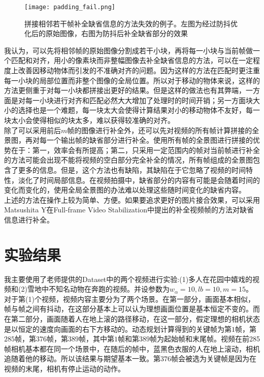 \documentclass[journal, a4paper]{IEEEtran}
\begin{document}
    \begin{figure}[!hbt]
    \begin{center}
    \texttt{[image: padding\_fail.png]}
    \caption{拼接相邻若干帧补全缺省信息的方法失效的例子。左图为经过防抖优化后的原始图像，右图为防抖后补全缺省部分的效果}
    \label{fig:padding_fail}
    \end{center}
  \end{figure}
    
    我认为，可以先将相邻帧的原始图像分割成若干小块，再将每一小块与当前帧做一个匹配和对齐，用小的像素块而非整幅图像去补全缺省信息的方法，可以在一定程度上改善因移动物体而引发的不准确对齐的问题。因为这样的方法在匹配时更注重每一小块的局部位置而非整个图像的全局位置。所以对于移动的物体来说，这样的方法更侧重于对每一小块都拼接出更好的结果。但是这样的做法也有其弊端，一方面是对每一小块进行对齐和匹配必然大大增加了处理时的时间开销；另一方面块大小的选择也是一个难题，每一块太大会使得计算结果对小的移动物体不友好，每一块太小会使得相似的块太多，难以获得较准确的对齐。\\
    
    除了可以采用前后$m$帧的图像进行补全外，还可以先对视频的所有帧计算拼接的全景图，再对每一个输出帧的缺省部分进行补全。使用所有帧的全景图进行拼接的优势在于：第一，效率会有所提高；第二，只采用一定范围内的帧对当前帧进行补全的方法可能会出现不能将视频的空白部分完全补全的情况，所有帧组成的全景图包含了更多的信息。但是，这个方法也有缺陷，其缺陷在于它忽略了视频的时间特性，淡化了时间局部信息。在视频拍摄中，缺省部分的内容有可能是会随着时间的变化而变化的，使用全局全景图的办法难以处理这些随时间变化的缺省内容。 \\
    
    上述的方法在操作上较为简单、方便。如果要追求更好的图片接合效果，可以采用Matsushita Y在Full-frame Video Stabilization\cite{full_frame}中提出的补全视频帧的方法对缺省信息进行补全。
    
    
\section{实验结果}
  我主要使用了老师提供的Dataset中的两个视频进行实验:(1)多人在花园中嬉戏的视频和(2)雪地中不知名动物在奔跑的视频。并设参数为$w_\alpha =10,lb=10,m=15$。 \\
    
    对于第(1)个视频，视频内容主要分为了两个场景。在第一部分，画面基本相似，帧与帧之间有抖动，在这部分基本上可以认为理想画面位置是基本恒定不变的。而在第二部分，画面随着人在地上滚的路径移动，在这一部分，假定理想的相机状态是以恒定的速度向画面的右下方移动的。动态规划计算得到的关键帧为第$1$帧，第$285$帧，第$376$帧，第$389$帧，其中第$1$帧和第$389$帧为起始帧和末尾帧。视频在前285帧相机基本都在同一个场景中，在随后的帧中，蓝黑色衣服的人在地上滚动，相机追随着他的移动。所以该结果与期望基本一致。第$376$帧会被选为关键帧是因为在视频的末尾，相机有停止运动的动作。\\
    
\end{document}
